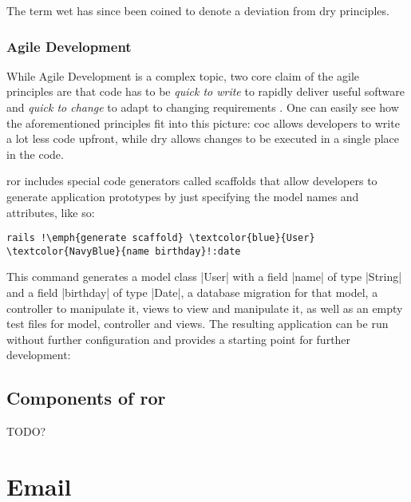 The term \acrfull{wet} has since been coined to denote a deviation from \gls{dry} principles. \citep{wet}

\subsubsection{Agile Development}

While Agile Development is a complex topic, two core claim of the agile principles are that code has to be \emph{quick to write} to rapidly deliver useful software \citep[Principle 1]{martin2003agile} and \emph{quick to change} to adapt to changing requirements \citep[Principle 2]{martin2003agile}. One can easily see how the aforementioned principles fit into this picture: \acrshort{coc} allows developers to write a lot less code upfront, while \acrshort{dry} allows changes to be executed in a single place in the code.

\gls{ror} includes special code generators called \gls{scaffold}s that allow developers to generate application prototypes by just specifying the model names and attributes, like so:

\begin{lstlisting}[escapechar=!]
  rails !\emph{generate scaffold} \textcolor{blue}{User} \textcolor{NavyBlue}{name birthday}!:date
\end{lstlisting}

This command generates a model class |User| with a field |name| of type |String| and a field |birthday| of type |Date|, a database migration for that model, a controller to manipulate it, views to view and manipulate it, as well as an empty test files for model, controller and views. The resulting application can be run without further configuration and provides a starting point for further development:


\subsection{Components of \gls{ror}}

TODO?


\section{Email}



